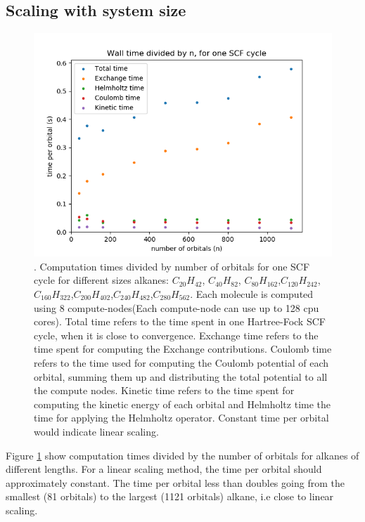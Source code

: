 \documentclass{article}
\begin{document}
\subsection{Scaling with system size}

\begin{figure}
\centering
\includegraphics[width=1.\textwidth]{Times_nAlkanes.png}
\caption{\label{fig01}. Computation times divided by number of orbitals for one SCF cycle for different sizes alkanes: $C_{20}H_{42}$, $C_{40}H_{82}$, $C_{80}H_{162}$,$ C_{120}H_{242}$,$ C_{160}H_{322}$,$ C_{200}H_{402}$,$ C_{240}H_{482}$,$ C_{280}H_{562}$. Each molecule is computed using 8 compute-nodes(Each compute-node can use up to 128 cpu cores). Total time refers to the time spent in one Hartree-Fock SCF cycle, when it is close to convergence. Exchange time refers to the time spent for computing the Exchange contributions. Coulomb time refers to the time used for computing the Coulomb potential of each orbital, summing them up and distributing the total potential to all the compute nodes. Kinetic time refers to the time spent for computing the kinetic energy of each orbital  and Helmholtz time the time for applying the Helmholtz operator. Constant time per orbital would indicate linear scaling.}
\end{figure}

Figure \ref{fig01} show computation times divided by the number of orbitals for alkanes of different lengths. For a linear scaling method, the time per orbital should approximately constant. The time per orbital less than doubles going from the smallest (81 orbitals) to the largest (1121 orbitals) alkane, i.e close to linear scaling. %
\end{document}
